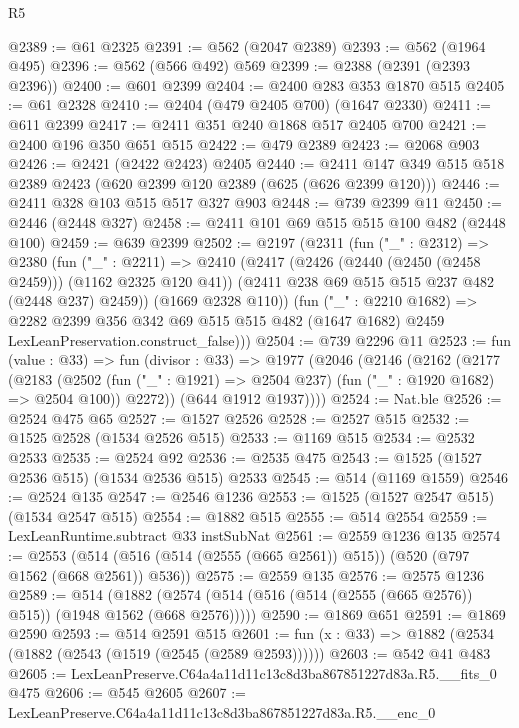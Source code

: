 \begin{lexlean}{R5}
\begin{coremodule}
@2389 := @61 @2325
@2391 := @562 (@2047 @2389)
@2393 := @562 (@1964 @495)
@2396 := @562 (@566 @492) @569
@2399 := @2388 (@2391 (@2393 @2396))
@2400 := @601 @2399
@2404 := @2400 @283 @353 @1870 @515
@2405 := @61 @2328
@2410 := @2404 (@479 @2405 @700) (@1647 @2330)
@2411 := @611 @2399
@2417 := @2411 @351 @240 @1868 @517 @2405 @700
@2421 := @2400 @196 @350 @651 @515
@2422 := @479 @2389
@2423 := @2068 @903
@2426 := @2421 (@2422 @2423) @2405
@2440 := @2411 @147 @349 @515 @518 @2389 @2423 (@620 @2399 @120 @2389 (@625 (@626 @2399 @120)))
@2446 := @2411 @328 @103 @515 @517 @327 @903
@2448 := @739 @2399 @11
@2450 := @2446 (@2448 @327)
@2458 := @2411 @101 @69 @515 @515 @100 @482 (@2448 @100)
@2459 := @639 @2399
@2502 := @2197
    (@2311
      (fun ("_" : @2312) =>
      @2380
        (fun ("_" : @2211) =>
        @2410
          (@2417
            (@2426 (@2440 (@2450 (@2458 @2459))) (@1162 @2325 @120 @41))
            (@2411 @238 @69 @515 @515 @237 @482 (@2448 @237) @2459))
          (@1669 @2328 @110))
        (fun ("_" : @2210 @1682) =>
        @2282
          @2399
          @356
          @342
          @69
          @515
          @515
          @482
          (@1647 @1682)
          @2459
          LexLeanPreservation.construct_false)))
@2504 := @739 @2296 @11
@2523 := fun (value : @33) =>
  fun (divisor : @33) =>
  @1977
    (@2046
      (@2146
        (@2162
          (@2177
            (@2183
              (@2502 (fun ("_" : @1921) => @2504 @237) (fun ("_" : @1920 @1682) => @2504 @100))
              @2272))
          (@644 @1912 @1937))))
@2524 := Nat.ble
@2526 := @2524 @475 @65
@2527 := @1527 @2526
@2528 := @2527 @515
@2532 := @1525 @2528 (@1534 @2526 @515)
@2533 := @1169 @515
@2534 := @2532 @2533
@2535 := @2524 @92
@2536 := @2535 @475
@2543 := @1525 (@1527 @2536 @515) (@1534 @2536 @515) @2533
@2545 := @514 (@1169 @1559)
@2546 := @2524 @135
@2547 := @2546 @1236
@2553 := @1525 (@1527 @2547 @515) (@1534 @2547 @515)
@2554 := @1882 @515
@2555 := @514 @2554
@2559 := LexLeanRuntime.subtract @33 instSubNat
@2561 := @2559 @1236 @135
@2574 := @2553 (@514 (@516 (@514 (@2555 (@665 @2561)) @515)) (@520 (@797 @1562 (@668 @2561)) @536))
@2575 := @2559 @135
@2576 := @2575 @1236
@2589 := @514
    (@1882 (@2574 (@514 (@516 (@514 (@2555 (@665 @2576)) @515)) (@1948 @1562 (@668 @2576)))))
@2590 := @1869 @651
@2591 := @1869 @2590
@2593 := @514 @2591 @515
@2601 := fun (x : @33) => @1882 (@2534 (@1882 (@2543 (@1519 (@2545 (@2589 @2593))))))
@2603 := @542 @41 @483
@2605 := LexLeanPreserve.C64a4a11d11c13c8d3ba867851227d83a.R5.__fits_0 @475
@2606 := @545 @2605
@2607 := LexLeanPreserve.C64a4a11d11c13c8d3ba867851227d83a.R5.__enc_0

\end{coremodule}
\end{lexlean}
